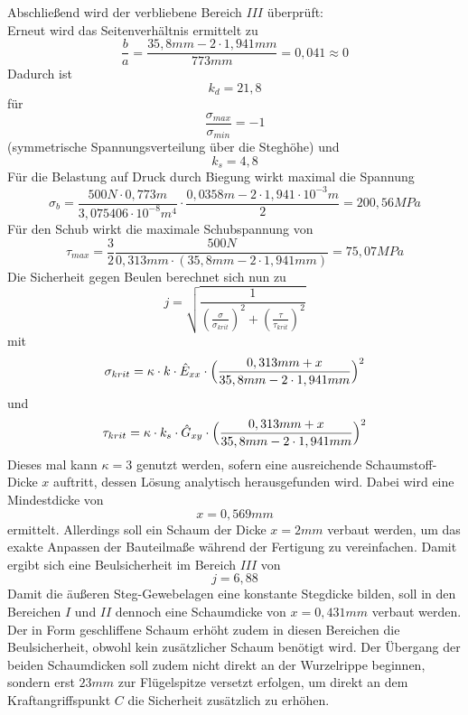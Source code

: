 \noindent Abschließend wird der verbliebene Bereich $III$ überprüft:\\
\noindent Erneut wird das Seitenverhältnis ermittelt zu 
\begin{equation}
	\frac{b}{a}=\frac{35,8mm - 2\cdot 1,941mm}{773mm}=0,041\approx 0
\end{equation}
Dadurch ist
\begin{equation}
	k_{d}=21,8
\end{equation}
für 
\begin{equation}
	\frac{\sigma_{max}}{\sigma_{min}}=-1
\end{equation} 
(symmetrische Spannungsverteilung über die Steghöhe) und
\begin{equation}
	k_{s} = 4,8
\end{equation}
Für die Belastung auf Druck durch Biegung wirkt maximal die Spannung
\begin{equation}
	\sigma_{b} = \frac{500N\cdot 0,773m}{3,075406\cdot 10^{-8}m^{4}}\cdot\frac{0,0358m - 2\cdot 1,941\cdot 10^{-3}m}{2}=200,56 MPa
\end{equation}
Für den Schub wirkt die maximale Schubspannung von
\begin{equation}
	\tau_{max}=\frac{3}{2}\frac{500N}{0,313mm\cdot(35,8mm-2\cdot 1,941mm)}=75,07MPa
\end{equation}
Die Sicherheit gegen Beulen berechnet sich nun zu 
\begin{equation}
	j=\sqrt{\frac{1}{(\frac{\sigma}{\sigma_{krit}})^{2}+(\frac{\tau}{\tau_{krit}})^{2}}}
\end{equation}
mit 
\begin{equation}
	\sigma_{krit}=\kappa\cdot k\cdot \hat{E}_{xx}\cdot \Bigl(\frac{0,313mm+x}{35,8mm -2\cdot 1,941mm}\Bigr)^{2}
\end{equation}
und
\begin{equation}
	\tau_{krit} = \kappa\cdot k_{s}\cdot \hat{G}_{xy}\cdot\Bigl(\frac{0,313mm + x}{35,8mm -2\cdot 1,941mm}\Bigr)^{2}
\end{equation}
Dieses mal kann $\kappa=3$ genutzt werden, sofern eine ausreichende Schaumstoff-Dicke $x$ auftritt, dessen Lösung analytisch herausgefunden wird. Dabei wird eine Mindestdicke von 
\begin{equation}
	x=0,569mm
\end{equation}
ermittelt. Allerdings soll ein Schaum der Dicke $x=2mm$ verbaut werden, um das exakte Anpassen der Bauteilmaße während der Fertigung zu vereinfachen. Damit ergibt sich eine Beulsicherheit im Bereich $III$ von
\begin{equation}
	j=6,88
\end{equation}
Damit die äußeren Steg-Gewebelagen eine konstante Stegdicke bilden, soll in den Bereichen $I$ und $II$ dennoch eine Schaumdicke von $x=0,431mm$ verbaut werden. Der in Form geschliffene Schaum erhöht zudem in diesen Bereichen die Beulsicherheit, obwohl kein zusätzlicher Schaum benötigt wird. Der Übergang der beiden Schaumdicken soll zudem nicht direkt an der Wurzelrippe beginnen, sondern erst $23mm$ zur Flügelspitze versetzt erfolgen, um direkt an dem Kraftangriffspunkt $C$ die Sicherheit zusätzlich zu erhöhen.
